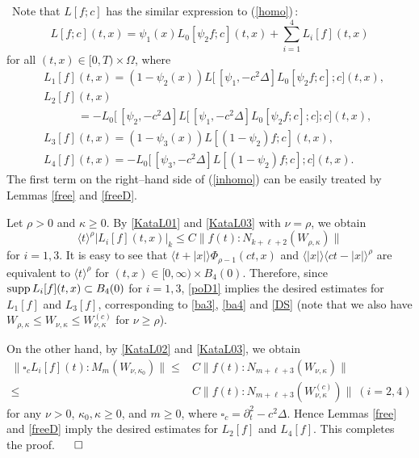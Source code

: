 \documentclass[12pt]{amsart}
\newcommand{\dal}{\square}
\newcommand{\pa}{\partial}
\newcommand{\norm}[2]{\|#1 \!:\! #2\|}
\DeclareMathOperator{\supp}{\rm supp}
\numberwithin{equation}{section}
\begin{document}
\
Note that $L[f; c]$ has the similar expression to (\ref{homo})\,:
\begin{equation}\label{inhomo}
L[f;c](t,x)=\psi_1(x) L_0[\psi_2 f;c](t,x)+\sum_{i=1}^4 L_i[f](t,x)
\end{equation}
for all $(t,x)\in [0,T)\times \Omega$, where 
\begin{align}\label{L1}
& L_1[f](t,x)=(1-\psi_2(x))L\bigl[\,[\psi_1,-c^2\Delta] L_0[\psi_2 f;c];c
\bigr](t,x),
\\ \label{L2}
& L_2[f](t,x)\\
\nonumber
& \qquad\quad =-L_0\bigl[\,[\psi_2,-c^2\Delta] L\bigl[\,[\psi_1,-c^2\Delta]
L_0[\psi_2 f;c];c \bigr];c \bigr](t,x),
\\ \label{L3}
& L_3[f](t,x)=(1-\psi_3(x)) L[(1-\psi_2) f;c](t,x),
\\ \label{L4}
& L_4[f](t,x)=-L_0\bigl[\,[\psi_3,-c^2\Delta] L[(1-\psi_2) f;c];c\bigr](t,x).
\end{align}
The first term on the right--hand side of (\ref{inhomo}) can be easily treated
by Lemmas \ref{free} and \ref{freeD}.

Let $\rho>0$ and $\kappa\ge 0$.
By \eqref{KataL01} and \eqref{KataL03} with $\nu=\rho$, we obtain
\begin{equation}\label{poD1}
\langle t \rangle^{\rho} |L_i[f](t,x)|_k
 \le C  \|f(t)\!:\!{N_{k+\ell+2}(W_{\rho,\kappa})}\|
\end{equation}
for $i=1,3$. 
It is easy to see that $\langle t+|x|\rangle \Phi_{\rho-1}(ct,x)$ 
and $\langle |x|\rangle \langle ct-|x|\rangle^\rho$ are
equivalent to $\langle t\rangle^\rho$ for $(t,x)\in [0,\infty)\times B_4(0)$.
Therefore, since $\supp L_i[f](t,x)\subset B_4(0)$ for $i=1,3$,
\eqref{poD1} implies the desired estimates
for $L_1[f]$ and $L_3[f]$,
corresponding to \eqref{ba3}, \eqref{ba4} and \eqref{DS}
(note that we also have 
$W_{\rho, \kappa}\le W_{\nu, \kappa}\le W_{\nu, \kappa}^{(c)}$
for $\nu\ge \rho$).

On the other hand, by \eqref{KataL02} and \eqref{KataL03},
we obtain
\begin{align}
\label{KataN01}
\norm{\dal_c L_i[f](t)}{M_{m}(W_{\nu, \kappa_0})}
\le & C \norm{f(t)}{N_{m+\ell+3}(W_{\nu, \kappa})}\\
\le & C \norm{f(t)}{N_{m+\ell+3}(W_{\nu, \kappa}^{(c)})}\ (i=2,4)
\nonumber
\end{align}
for any $\nu>0$, $\kappa_0, \kappa\ge 0$, and $m\ge0$, where $\dal_c=\pa_t^2-c^2\Delta$.
Hence Lemmas \ref{free} and \ref{freeD} imply the desired estimates
for $L_2[f]$ and $L_4[f]$.
This completes the proof. \hfill$\qed$
\end{document}

